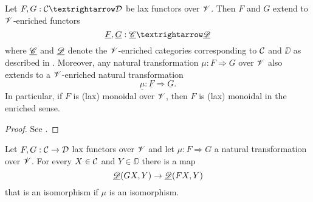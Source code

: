 \documentclass[twoside]{article}
\begin{document}
\begin{propo}\label{enrichedtrans}
Let $F,G : \CC → \DD$ be lax functors over $\mathscr{V}$. Then $F$ and $G$ extend to $\mathscr{V}$-enriched
functors
\[\underline{F},\underline{G} : \uC → \uD\]
where $\underline{\mathscr{C}}$ and $\underline{\mathscr{D}}$ denote the $\mathscr{V}$-enriched categories corresponding to ${\mathcal C}$ and $\DD$ as described in . Moreover, any natural transformation $μ : F ⇒ G$ over $\mathscr{V}$ also extends to a $\mathscr{V}$-enriched natural
transformation
\[\underline{μ} : \underline{F} ⇒ \underline{G}.\]
In particular, if $F$ is (lax) monoidal over $\mathscr{V}$, then $F$ is (lax) monoidal in the enriched sense.
\end{propo}
\begin{proof}
See \cite[Proposition 4.11]{whitehous}.
\end{proof}
\begin{lem}
Let $F,G:{\mathcal C}\to{\mathcal D}$ lax functors over $\mathscr{V}$ and let $\mu : F\Rightarrow G$ a natural transformation over $\mathscr{V}$. For every $X\in{\mathcal C}$ and $Y\in\DD$ there is a map \[\underline{\mathscr{D}}(GX,Y)\to\underline{\mathscr{D}}(FX,Y)\] that is an isomorphism if $\mu$ is an isomorphism.
\end{lem}
\end{document}
